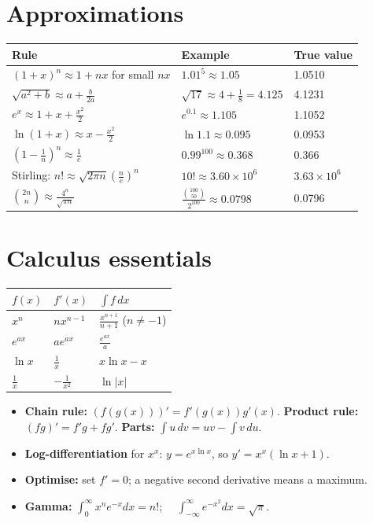 \documentclass[11pt,a4paper,openany]{report}
\newcommand{\C}[2]{\binom{#1}{#2}}
\begin{document}
\section{Approximations}
\begin{center}\small
\begin{tabular}{lll}
\toprule
Rule & Example & True value\\\midrule
$(1+x)^n\approx1+nx$ for small $nx$ & $1.01^{5}\approx1.05$ & 1.0510\\
$\sqrt{a^2+b}\approx a+\frac b{2a}$ & $\sqrt{17}\approx4+\frac18=4.125$ & 4.1231\\
$e^x\approx1+x+\frac{x^2}2$ & $e^{0.1}\approx1.105$ & 1.1052\\
$\ln(1+x)\approx x-\frac{x^2}2$ & $\ln1.1\approx0.095$ & 0.0953\\
$\left(1-\frac1n\right)^n\approx\frac1e$ & $0.99^{100}\approx0.368$ & 0.366\\
Stirling: $n!\approx\sqrt{2\pi n}\left(\frac ne\right)^n$ & $10!\approx3.60\times10^6$ & $3.63\times10^6$\\
$\C{2n}n\approx\frac{4^n}{\sqrt{\pi n}}$ & $\frac{\C{100}{50}}{2^{100}}\approx0.0798$ & 0.0796\\
\bottomrule
\end{tabular}
\end{center}

\section{Calculus essentials}
\begin{center}\small
\begin{tabular}{lll}
\toprule
$f(x)$ & $f'(x)$ & $\int f\,dx$\\\midrule
$x^n$ & $nx^{n-1}$ & $\frac{x^{n+1}}{n+1}$ ($n\ne-1$)\\
$e^{ax}$ & $ae^{ax}$ & $\frac{e^{ax}}a$\\
$\ln x$ & $\frac1x$ & $x\ln x-x$\\
$\frac1x$ & $-\frac1{x^2}$ & $\ln|x|$\\
\bottomrule
\end{tabular}
\end{center}
\begin{itemize}[nosep]
\item \textbf{Chain rule:} $(f(g(x)))'=f'(g(x))g'(x)$. \textbf{Product rule:} $(fg)'=f'g+fg'$. \textbf{Parts:} $\int u\,dv=uv-\int v\,du$.
\item \textbf{Log-differentiation} for $x^x$: $y=e^{x\ln x}$, so $y'=x^x(\ln x+1)$.
\item \textbf{Optimise:} set $f'=0$; a negative second derivative means a maximum.
\item \textbf{Gamma:} $\int_0^\infty x^ne^{-x}dx=n!$; $\quad\int_{-\infty}^\infty e^{-x^2}dx=\sqrt\pi$.
\end{itemize}
\end{document}
